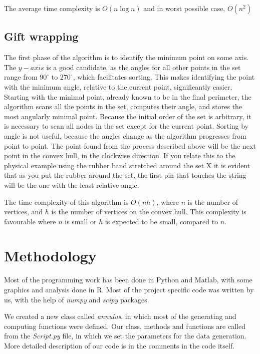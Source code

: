 \documentclass[12pt,a4paper]{article}
\begin{document}
The average time complexity is $O(n\log{n})$ and in worst possible case, $O(n^2)$

\subsection{Gift wrapping}

The first phase of the algorithm is to identify the minimum point on some axis. The $ y-axis $ is a good candidate, as the angles for all other points in the set range from $90^{\circ}$  to $270^ {\circ}$, which facilitates sorting. This makes identifying the point with the minimum angle, relative to the current point, significantly easier. Starting with the minimal point, already known to be in the final perimeter, the algorithm scans all the points in the set, computes their angle, and stores the most angularly minimal point. Because the initial order of the set is arbitrary, it is necessary to scan all nodes in the set except for the current point. Sorting by angle is not useful, because the angles change as the algorithm progresses from point to point. The point found from the process described above will be the next point in the convex hull, in the clockwise direction. If you relate this to the physical example using the rubber band stretched around the set X it is evident that as you put the rubber around the set, the first pin that touches the string will be the one with the least relative angle.\medskip

The time complexity of this algorithm is $O(nh)$, where $n$ is the number of vertices, and $h$ is the number of vertices on the convex hull. This complexity is favourable where $n$ is small or $h$ is expected to be small, compared to $n$. \medskip

\section{Methodology}
Most of the programming work has been done in Python and Matlab, with some graphics and analysis done in R. Most of the project specific code was written by us, with the help of \textit{numpy} and \textit{scipy} packages.
\medskip

We created a new class called \textit{annulus}, in which most of the generating and computing functions were defined. Our class, methods and functions are called from the \textit{Script.py} file, in which we set the parameters for the data generation. More detailed description of our code is in the comments in the code itself. \medskip
\end{document}
